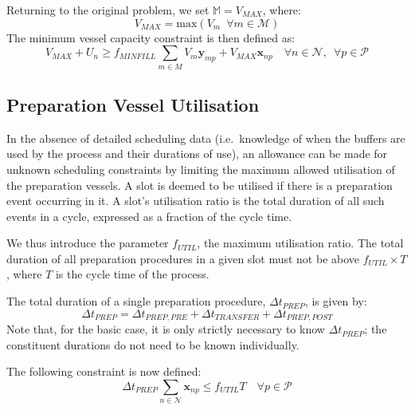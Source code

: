 Returning to the original problem, we set $\mathbb{M} = V_{\mathit{MAX}}$,
where:
\begin{equation}
    V_{\mathit{MAX}} = \text{max} \left( V_{m} \enspace \forall m \in
    \mathcal{M} \right)
\end{equation}
The minimum vessel capacity constraint is then defined as:
\begin{equation}
    V_{\mathit{MAX}} + U_{n}
    \ge f_{\mathit{MINFILL}} \sum_{m \in M} V_{m} \boldsymbol{y}_{mp}
    + V_{\mathit{MAX}} \boldsymbol{x}_{np} 
    \quad \forall n \in \mathcal{N}, \enspace \forall p \in \mathcal{P}
    \label{eq.constr3b}
\end{equation}

\subsection{Preparation Vessel Utilisation}\label{SS.constr4}

In the absence of detailed scheduling data (i.e.\ knowledge of when the buffers
are used by the process and their durations of use), an allowance can be made
for unknown scheduling constraints by limiting the maximum allowed utilisation
of the preparation vessels.
A slot is deemed to be utilised if there is a preparation event occurring in
it. A slot's utilisation ratio is the total duration of all such events in a
cycle, expressed as a fraction of the cycle time.

We thus introduce the parameter $f_{\mathit{UTIL}}$, the maximum utilisation
ratio.
The total duration of all preparation procedures in a given slot must not be
above $f_{\mathit{UTIL}} \times T$, where $T$ is the cycle time of the
process.

The total duration of a single preparation procedure,
$\Delta t_{\mathit{PREP}}$, is given by:
\begin{equation}
    \Delta t_{\mathit{PREP}} = \Delta t_{\mathit{PREP,PRE}} + 
    \Delta t_{\mathit{TRANSFER}} + \Delta t_{\mathit{PREP,POST}}
\end{equation}
Note that, for the basic case, it is only strictly necessary to know
$\Delta t_{\mathit{PREP}}$; the constituent durations do not need to be
known individually.

The following constraint is now defined:
\begin{equation}
    \Delta t_{\mathit{PREP}} \sum_{n \in \mathcal{N}} \boldsymbol{x}_{np} \le
    f_{\mathit{UTIL}} T \quad \forall p \in \mathcal{P}
    \label{eq.constr4}
\end{equation}

